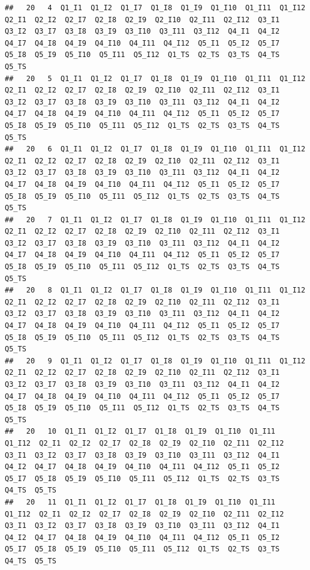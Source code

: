 \documentclass[
]{book}
\begin{document}
\begin{verbatim}
##   20   4  Q1_I1  Q1_I2  Q1_I7  Q1_I8  Q1_I9  Q1_I10  Q1_I11  Q1_I12  Q2_I1  Q2_I2  Q2_I7  Q2_I8  Q2_I9  Q2_I10  Q2_I11  Q2_I12  Q3_I1  Q3_I2  Q3_I7  Q3_I8  Q3_I9  Q3_I10  Q3_I11  Q3_I12  Q4_I1  Q4_I2  Q4_I7  Q4_I8  Q4_I9  Q4_I10  Q4_I11  Q4_I12  Q5_I1  Q5_I2  Q5_I7  Q5_I8  Q5_I9  Q5_I10  Q5_I11  Q5_I12  Q1_TS  Q2_TS  Q3_TS  Q4_TS  Q5_TS
##   20   5  Q1_I1  Q1_I2  Q1_I7  Q1_I8  Q1_I9  Q1_I10  Q1_I11  Q1_I12  Q2_I1  Q2_I2  Q2_I7  Q2_I8  Q2_I9  Q2_I10  Q2_I11  Q2_I12  Q3_I1  Q3_I2  Q3_I7  Q3_I8  Q3_I9  Q3_I10  Q3_I11  Q3_I12  Q4_I1  Q4_I2  Q4_I7  Q4_I8  Q4_I9  Q4_I10  Q4_I11  Q4_I12  Q5_I1  Q5_I2  Q5_I7  Q5_I8  Q5_I9  Q5_I10  Q5_I11  Q5_I12  Q1_TS  Q2_TS  Q3_TS  Q4_TS  Q5_TS
##   20   6  Q1_I1  Q1_I2  Q1_I7  Q1_I8  Q1_I9  Q1_I10  Q1_I11  Q1_I12  Q2_I1  Q2_I2  Q2_I7  Q2_I8  Q2_I9  Q2_I10  Q2_I11  Q2_I12  Q3_I1  Q3_I2  Q3_I7  Q3_I8  Q3_I9  Q3_I10  Q3_I11  Q3_I12  Q4_I1  Q4_I2  Q4_I7  Q4_I8  Q4_I9  Q4_I10  Q4_I11  Q4_I12  Q5_I1  Q5_I2  Q5_I7  Q5_I8  Q5_I9  Q5_I10  Q5_I11  Q5_I12  Q1_TS  Q2_TS  Q3_TS  Q4_TS  Q5_TS
##   20   7  Q1_I1  Q1_I2  Q1_I7  Q1_I8  Q1_I9  Q1_I10  Q1_I11  Q1_I12  Q2_I1  Q2_I2  Q2_I7  Q2_I8  Q2_I9  Q2_I10  Q2_I11  Q2_I12  Q3_I1  Q3_I2  Q3_I7  Q3_I8  Q3_I9  Q3_I10  Q3_I11  Q3_I12  Q4_I1  Q4_I2  Q4_I7  Q4_I8  Q4_I9  Q4_I10  Q4_I11  Q4_I12  Q5_I1  Q5_I2  Q5_I7  Q5_I8  Q5_I9  Q5_I10  Q5_I11  Q5_I12  Q1_TS  Q2_TS  Q3_TS  Q4_TS  Q5_TS
##   20   8  Q1_I1  Q1_I2  Q1_I7  Q1_I8  Q1_I9  Q1_I10  Q1_I11  Q1_I12  Q2_I1  Q2_I2  Q2_I7  Q2_I8  Q2_I9  Q2_I10  Q2_I11  Q2_I12  Q3_I1  Q3_I2  Q3_I7  Q3_I8  Q3_I9  Q3_I10  Q3_I11  Q3_I12  Q4_I1  Q4_I2  Q4_I7  Q4_I8  Q4_I9  Q4_I10  Q4_I11  Q4_I12  Q5_I1  Q5_I2  Q5_I7  Q5_I8  Q5_I9  Q5_I10  Q5_I11  Q5_I12  Q1_TS  Q2_TS  Q3_TS  Q4_TS  Q5_TS
##   20   9  Q1_I1  Q1_I2  Q1_I7  Q1_I8  Q1_I9  Q1_I10  Q1_I11  Q1_I12  Q2_I1  Q2_I2  Q2_I7  Q2_I8  Q2_I9  Q2_I10  Q2_I11  Q2_I12  Q3_I1  Q3_I2  Q3_I7  Q3_I8  Q3_I9  Q3_I10  Q3_I11  Q3_I12  Q4_I1  Q4_I2  Q4_I7  Q4_I8  Q4_I9  Q4_I10  Q4_I11  Q4_I12  Q5_I1  Q5_I2  Q5_I7  Q5_I8  Q5_I9  Q5_I10  Q5_I11  Q5_I12  Q1_TS  Q2_TS  Q3_TS  Q4_TS  Q5_TS
##   20   10  Q1_I1  Q1_I2  Q1_I7  Q1_I8  Q1_I9  Q1_I10  Q1_I11  Q1_I12  Q2_I1  Q2_I2  Q2_I7  Q2_I8  Q2_I9  Q2_I10  Q2_I11  Q2_I12  Q3_I1  Q3_I2  Q3_I7  Q3_I8  Q3_I9  Q3_I10  Q3_I11  Q3_I12  Q4_I1  Q4_I2  Q4_I7  Q4_I8  Q4_I9  Q4_I10  Q4_I11  Q4_I12  Q5_I1  Q5_I2  Q5_I7  Q5_I8  Q5_I9  Q5_I10  Q5_I11  Q5_I12  Q1_TS  Q2_TS  Q3_TS  Q4_TS  Q5_TS
##   20   11  Q1_I1  Q1_I2  Q1_I7  Q1_I8  Q1_I9  Q1_I10  Q1_I11  Q1_I12  Q2_I1  Q2_I2  Q2_I7  Q2_I8  Q2_I9  Q2_I10  Q2_I11  Q2_I12  Q3_I1  Q3_I2  Q3_I7  Q3_I8  Q3_I9  Q3_I10  Q3_I11  Q3_I12  Q4_I1  Q4_I2  Q4_I7  Q4_I8  Q4_I9  Q4_I10  Q4_I11  Q4_I12  Q5_I1  Q5_I2  Q5_I7  Q5_I8  Q5_I9  Q5_I10  Q5_I11  Q5_I12  Q1_TS  Q2_TS  Q3_TS  Q4_TS  Q5_TS

\end{verbatim}
\end{document}

